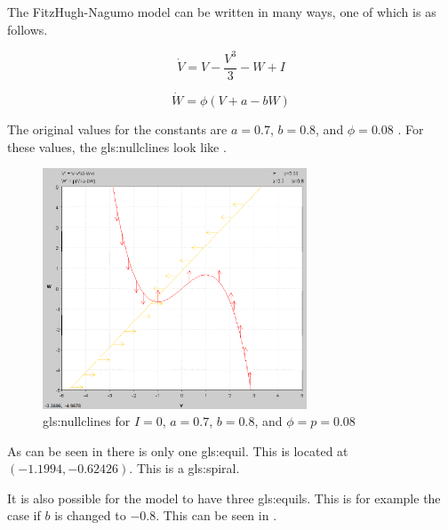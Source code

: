 \documentclass[class={myRUCProject}, crop=false]{standalone}
\begin{document}
The FitzHugh-Nagumo model can be written in many ways, one of which is as follows.

\begin{equation}
    \dot{V}=V-\frac{V^{3}}{3}-W+I
\end{equation}

\begin{equation}
    \dot{W}=\phi (V+a-bW)
\end{equation}

The original values for the constants are \(a=0.7\), \(b=0.8\), and \(\phi=0.08\) \cite{}. For these values, the \glspl{gls:nullcline} look like . 

\begin{figure}[ht]
    \centering
    \includegraphics[width=0.7\textwidth]{Pictures/Alex/Nullclines - original.PNG}
    \caption{\Glspl{gls:nullcline} for \(I=0\), \(a=0.7\), \(b=0.8\), and \(\phi=p=0.08\)}
    \label{fig:nullclines-original}
\end{figure}

As can be seen in  there is only one \gls{gls:equil}. This is located at \((-1.1994, -0.62426)\). This is a \gls{gls:spiral}. 

It is also possible for the model to have three \glspl{gls:equil}. This is for example the case if \(b\) is changed to \(-0.8\). This can be seen in .
\end{document}

